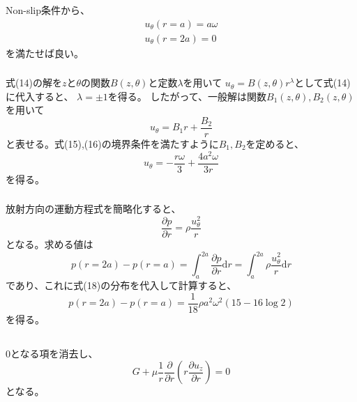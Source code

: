 \documentclass[a4paper]{jsarticle}
\begin{document}
\subsubsection{}
Non-slip条件から、
\begin{align}
  u_{\theta}(r = a) = a \omega \\
  u_{\theta}(r = 2a) = 0 
\end{align}
を満たせば良い。

\subsubsection{}
式(14)の解を$z$と$\theta$の関数$B(z, \theta)$と定数$\lambda$を用いて
$u_{\theta} = B(z, \theta) r^{\lambda}$として式(14)に代入すると、
$\lambda = \pm 1$を得る。
したがって、一般解は関数$B_1(z, \theta), B_2(z, \theta)$を用いて
\begin{equation}
  u_{\theta} = B_1 r + \frac{B_2}{r}
\end{equation}
と表せる。式(15),(16)の境界条件を満たすように$B_1, B_2$を定めると、
\begin{equation}
  u_{\theta} = -\frac{r \omega}{3} + \frac{4 a^2 \omega}{3 r}
\end{equation}
を得る。

\subsubsection{}
放射方向の運動方程式を簡略化すると、
\begin{equation}
  \frac{\partial p}{\partial r} = \rho \frac{u_{\theta}^2}{r}
\end{equation}
となる。求める値は
\begin{equation}
  p(r = 2a) - p(r = a) 
  = \int_a^{2a} \frac{\partial p}{\partial r} \mathrm{d} r
  = \int_a^{2a} \rho \frac{u_{\theta}^2}{r} \mathrm{d} r
\end{equation}
であり、これに式(18)の分布を代入して計算すると、
\begin{equation}
  p(r = 2a) - p(r = a) = \frac{1}{18} \rho a^2 \omega^2 (15 - 16 \log 2)
\end{equation}
を得る。

\subsection{}
\subsubsection{}
0となる項を消去し、
\begin{equation}
  G + \mu \frac{1}{r} \frac{\partial}{\partial r} \left(r \frac{\partial u_z}{\partial r}\right) = 0
\end{equation}
となる。
\end{document}
